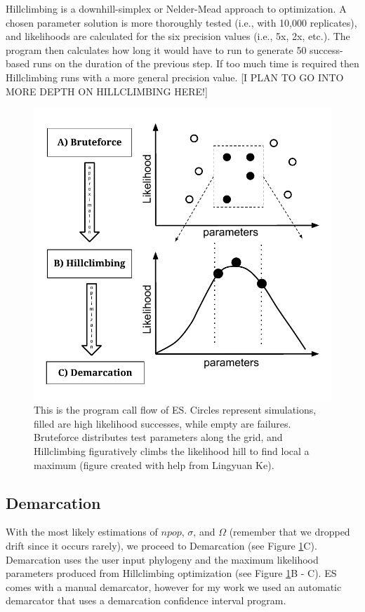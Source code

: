 Hillclimbing is a downhill-simplex or Nelder-Mead approach to optimization.
A chosen parameter solution is more thoroughly tested (i.e., with 10,000 replicates), and likelihoods are calculated for the six precision values (i.e., 5x, 2x, etc.).
The program then calculates how long it would have to run to generate 50 success-based runs on the duration of the previous step.
If too much time is required then Hillclimbing runs with a more general precision value.
[I PLAN TO GO INTO MORE DEPTH ON HILLCLIMBING HERE!]


\begin{figure}[h!]
 \centering
 \includegraphics[scale=0.75]{images/ESFlow-CH2.pdf}
 \caption[Ecotype Simulation program flow diagram.]{This is the program call flow of ES. Circles represent simulations, filled are high likelihood successes, while empty are failures. Bruteforce distributes test parameters along the grid, and Hillclimbing figuratively climbs the likelihood hill to find local a maximum (figure created with help from Lingyuan Ke). }
 \label{fig:Flow}
\end{figure}

\subsection*{Demarcation}
With the most likely estimations of $npop$, $\sigma$, and $\Omega$ (remember that we dropped drift since it occurs rarely), we proceed to Demarcation (see Figure \ref{fig:Flow}C).
Demarcation uses the user input phylogeny and the maximum likelihood parameters produced from Hillclimbing optimization (see Figure \ref{fig:Flow}B - C).
ES comes with a manual demarcator, however for my work we used an automatic demarcator that uses a demarcation confidence interval program.

